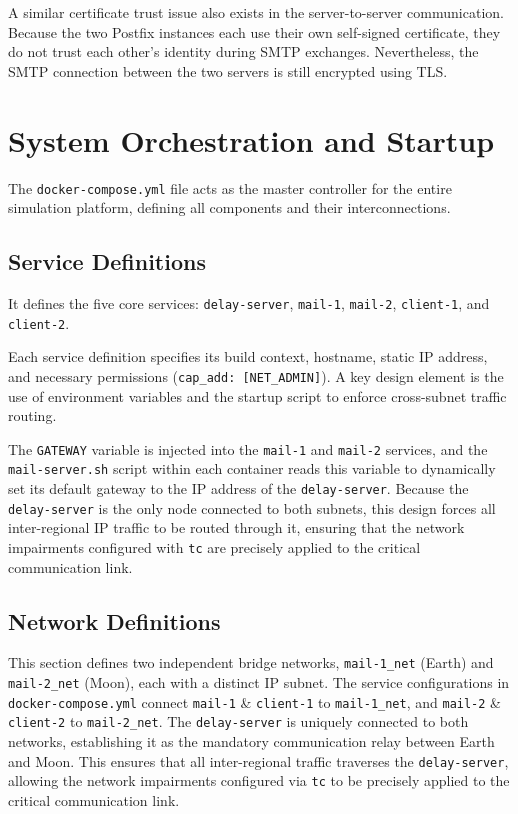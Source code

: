 A similar certificate trust issue also exists in the server-to-server communication. Because the two Postfix instances each use their own self-signed certificate, they do not trust each other's identity during SMTP exchanges. Nevertheless, the SMTP connection between the two servers is still encrypted using TLS.

\section{System Orchestration and Startup}
The \texttt{docker-compose.yml} file acts as the master controller for the entire simulation platform, defining all components and their interconnections.

\subsection*{Service Definitions}
It defines the five core services: \texttt{delay-server}, \texttt{mail-1}, \texttt{mail-2}, \texttt{client-1}, and \texttt{client-2}.

Each service definition specifies its build context, hostname, static IP address, and necessary permissions (\texttt{cap\_add: [NET\_ADMIN]}).  
A key design element is the use of environment variables and the startup script to enforce cross-subnet traffic routing.  

The \texttt{GATEWAY} variable is injected into the \texttt{mail-1} and \texttt{mail-2} services, and the \texttt{mail-server.sh} script within each container reads this variable to dynamically set its default gateway to the IP address of the \texttt{delay-server}.  
Because the \texttt{delay-server} is the only node connected to both subnets, this design forces all inter-regional IP traffic to be routed through it, ensuring that the network impairments configured with \texttt{tc} are precisely applied to the critical communication link.


\subsection*{Network Definitions}
This section defines two independent bridge networks, \texttt{mail-1\_net} (Earth) and \texttt{mail-2\_net} (Moon), each with a distinct IP subnet.  
The service configurations in \texttt{docker-compose.yml} connect \texttt{mail-1} \& \texttt{client-1} to \texttt{mail-1\_net}, and \texttt{mail-2} \& \texttt{client-2} to \texttt{mail-2\_net}.  
The \texttt{delay-server} is uniquely connected to both networks, establishing it as the mandatory communication relay between Earth and Moon.  
This ensures that all inter-regional traffic traverses the \texttt{delay-server}, allowing the network impairments configured via \texttt{tc} to be precisely applied to the critical communication link.

